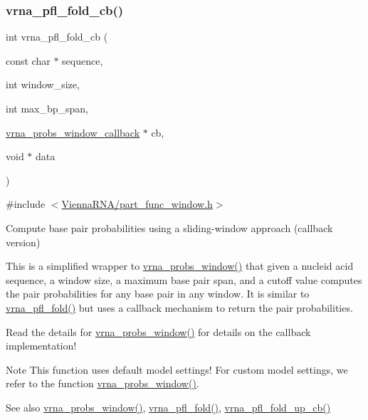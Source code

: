 \subsubsection{\texorpdfstring{vrna\+\_\+pfl\+\_\+fold\+\_\+cb()}{vrna\_pfl\_fold\_cb()}}
{\footnotesize\ttfamily int vrna\+\_\+pfl\+\_\+fold\+\_\+cb (\begin{DoxyParamCaption}\item[{const char $\ast$}]{sequence,  }\item[{int}]{window\+\_\+size,  }\item[{int}]{max\+\_\+bp\+\_\+span,  }\item[{\hyperlink{group__part__func__window_gabe710a1182e6db69cc75329dfc9bed67}{vrna\+\_\+probs\+\_\+window\+\_\+callback} $\ast$}]{cb,  }\item[{void $\ast$}]{data }\end{DoxyParamCaption})}



{\ttfamily \#include $<$\hyperlink{part__func__window_8h}{Vienna\+R\+N\+A/part\+\_\+func\+\_\+window.\+h}$>$}



Compute base pair probabilities using a sliding-\/window approach (callback version) 

This is a simplified wrapper to \hyperlink{group__part__func__window_ga7115d012988541a65ec323c5f17a334b}{vrna\+\_\+probs\+\_\+window()} that given a nucleid acid sequence, a window size, a maximum base pair span, and a cutoff value computes the pair probabilities for any base pair in any window. It is similar to \hyperlink{group__part__func__window_ga6267230f20cab0e2315375310b4dad85}{vrna\+\_\+pfl\+\_\+fold()} but uses a callback mechanism to return the pair probabilities.

Read the details for \hyperlink{group__part__func__window_ga7115d012988541a65ec323c5f17a334b}{vrna\+\_\+probs\+\_\+window()} for details on the callback implementation!

\begin{DoxyNote}{Note}
This function uses default model settings! For custom model settings, we refer to the function \hyperlink{group__part__func__window_ga7115d012988541a65ec323c5f17a334b}{vrna\+\_\+probs\+\_\+window()}.
\end{DoxyNote}
\begin{DoxySeeAlso}{See also}
\hyperlink{group__part__func__window_ga7115d012988541a65ec323c5f17a334b}{vrna\+\_\+probs\+\_\+window()}, \hyperlink{group__part__func__window_ga6267230f20cab0e2315375310b4dad85}{vrna\+\_\+pfl\+\_\+fold()}, \hyperlink{group__part__func__window_gac3251d3da0238d6d9ffdd6703b00f1d3}{vrna\+\_\+pfl\+\_\+fold\+\_\+up\+\_\+cb()}
\end{DoxySeeAlso}

